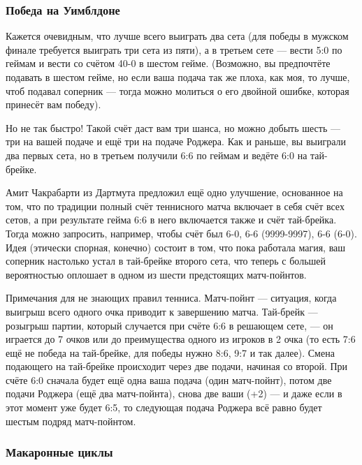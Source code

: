 \subsubsection*{Победа на Уимблдоне}

Кажется очевидным, что лучше всего выиграть два сета (для победы в мужском финале требуется выиграть три сета из пяти), а в третьем сете --- вести 5:0 по
геймам и вести со счётом 40-0 в шестом гейме.
(Возможно, вы предпочтёте подавать в шестом гейме, но если ваша подача так же плоха, как моя, то лучше, чтоб подавал соперник --- тогда можно молиться о его двойной ошибке, которая принесёт вам победу).

Но не так быстро!
Такой счёт даст вам три шанса, но можно добыть шесть --- три на вашей подаче и ещё три на подаче Роджера.
Как и раньше, вы выиграли два первых сета, но в третьем получили 6:6 по геймам и ведёте 6:0 на тай-брейке.

Амит Чакрабарти из Дартмута предложил ещё одно улучшение, основанное на том, что по традиции полный счёт теннисного матча включает в себя счёт всех сетов, а при результате гейма 6:6 в него включается также и счёт тай-брейка. Тогда можно запросить, например, чтобы счёт был 6-0, 6-6 (9999-9997), 6-6 (6-0).
Идея (этически спорная, конечно) состоит в том, что пока работала магия, ваш соперник настолько устал в тай-брейке второго сета, что теперь с большей вероятностью оплошает в одном из шести предстоящих матч-пойнтов.

\begin{addedbytheeditors}
Примечания для не знающих правил тенниса.
Матч-пойнт --- ситуация, когда выигрыш всего одного очка приводит к завершению матча.
Тай-брейк --- розыгрыш партии, который
случается при счёте 6:6 в решающем сете, --- он играется до 7 очков или до преимущества
одного из игроков в 2 очка (то есть 7:6 ещё не победа на тай-брейке, для победы нужно 8:6, 9:7 и так далее).
Смена подающего на тай-брейке происходит через две подачи, начиная со второй.
При счёте 6:0 сначала будет ещё одна ваша подача (один матч-пойнт), потом две подачи Роджера (ещё два матч-пойнта), снова две ваши (+2) --- и даже если в этот момент уже будет 6:5, то следующая подача Роджера всё равно будет шестым подряд матч-пойнтом.\pr
\end{addedbytheeditors}

\subsubsection*{Макаронные циклы}

